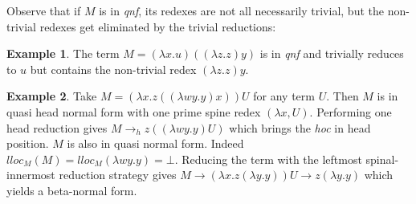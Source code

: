 \documentclass[xchauthor,chkrefs,GCNS,amsmath,amsthm,rotating,leaveRGB]{tcsg}
\theoremstyle{plain}
\theoremstyle{definition}
\newtheorem{example}{Example}[section]
\begin{document}
%
%
%
%
%

Observe that if $M$ is in \emph{qnf}, its redexes are not all necessarily
trivial, but the non-trivial redexes get eliminated by the trivial
reductions:

\begin{example}
The term $M = (\lambda x . u) ((\lambda z .z) y)$ is in \emph{qnf} and
trivially reduces to $u$ but contains the non-trivial redex $(\lambda z .z)
y$.
\end{example}

\begin{example}
Take $M = (\lambda x . z ((\lambda w y . y)x)) U$ for any term $U$. Then $M$
is in quasi head normal form with one prime spine redex $(\lambda x,U)$.
Performing one head reduction gives $M \rightarrow _{h} z ((\lambda w y. y)
U)$ which brings the \emph{hoc} in head position. $M$ is also in quasi normal
form. Indeed $lloc_{M}(M) = lloc_{M} (\lambda w y . y) = \bot $. Reducing the
term with the leftmost spinal-innermost reduction strategy gives  $M
\rightarrow (\lambda x . z (\lambda y . y)) U \rightarrow  z (\lambda y . y)
$ which yields a beta-normal form.
\end{example}
\end{document}
